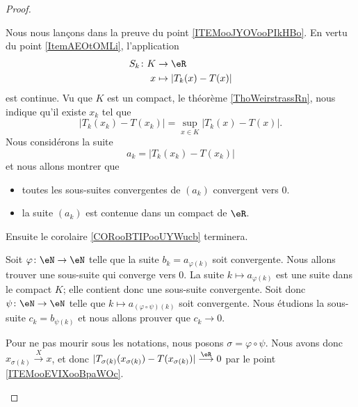 \begin{proof}
\begin{subproof}
		Nous nous lançons dans la preuve du point \ref{ITEMooJYOVooPIkHBo}. En vertu du point \ref{ItemAEOtOMLi}, l'application
		\begin{equation}
			\begin{aligned}
				S_k\colon K & \to \eR                 \\
				x           & \mapsto | T_k(x)-T(x) |
			\end{aligned}
		\end{equation}
		est continue. Vu que \( K\) est un compact, le théorème \ref{ThoWeirstrassRn}, nous indique qu'il existe \( x_k\) tel que
		\begin{equation}
			| T_k(x_k)-T(x_k) |=\sup_{x\in K}| T_k(x)-T(x) |.
		\end{equation}
		Nous considérons la suite
		\begin{equation}
			a_k=| T_k(x_k)-T(x_k) |
		\end{equation}
		et nous allons montrer que
		\begin{itemize}
			\item toutes les sous-suites convergentes de \( (a_k)\) convergent vers \( 0\).
			\item la suite \( (a_k)\) est contenue dans un compact de \( \eR\).
		\end{itemize}
		Ensuite le corolaire \ref{CORooBTIPooUYWucb} terminera.
		\begin{subproof}

			Soit \( \varphi\colon \eN\to \eN\) telle que la suite \( b_k=a_{\varphi(k)}\) soit convergente. Nous allons trouver une sous-suite qui converge vers \( 0\).  La suite \( k\mapsto a_{\varphi(k)}\) est une suite dans le compact \( K\); elle contient donc une sous-suite convergente. Soit donc \( \psi\colon \eN\to \eN\) telle que \( k\mapsto a_{(\varphi\circ\psi)(k)}\) soit convergente. Nous étudions la sous-suite \( c_k=b_{\psi(k)}\) et nous allons prouver que \( c_k\to 0\).

			Pour ne pas mourir sous les notations, nous posons \( \sigma=\varphi\circ\psi\). Nous avons donc \( x_{\sigma(k)}\stackrel{X}{\longrightarrow}x\), et donc  \( | T_{\sigma(k)}(x_{\sigma(k)})-T(x_{\sigma(k)}) |\stackrel{\eR}{\longrightarrow}0\) par le point \ref{ITEMooEVIXooBpaWOc}.



\end{subproof}
\end{subproof}
\end{proof}
